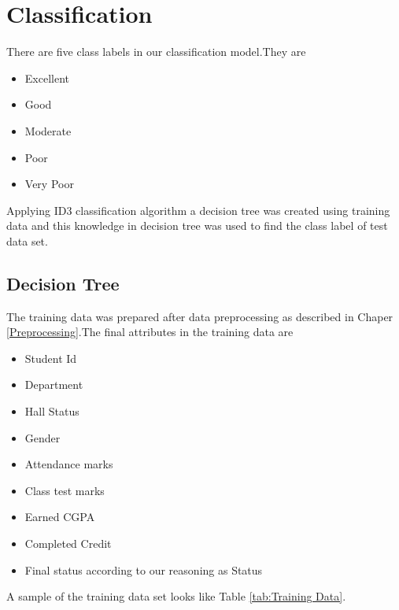 
\chapter{Classification} %

\label{Classification} %
There are five class labels in our classification model.They are
\begin{itemize}
\item Excellent
\item Good
\item Moderate
\item Poor
\item Very Poor
\end{itemize}
Applying ID3 classification algorithm a decision tree was created using training data and this knowledge in decision tree was used to find the class label of test data set.



\section{Decision Tree}
The training data was prepared after data preprocessing as described in Chaper \ref{Preprocessing}.The final attributes in the training data are
\begin{itemize}
\item Student Id 
\item Department	
\item Hall Status 	
\item Gender 	
\item Attendance marks 	
\item Class test marks 	
\item Earned CGPA 
\item Completed Credit 
\item Final status according to our reasoning as Status
\end{itemize}
A sample of the training data set looks like Table \ref{tab:Training Data}.


